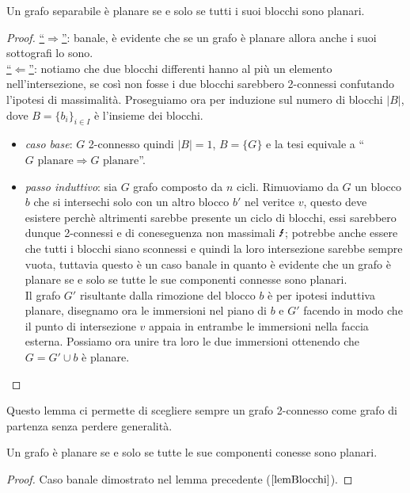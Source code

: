 \begin{lemma}\label{lemBlocchi}
    Un grafo separabile è planare se e solo se tutti i suoi blocchi sono planari.
    \begin{proof}
        \underline{“\(\Rightarrow\)”}: banale, è evidente che se un grafo è planare allora anche i suoi sottografi lo sono.\\
        \underline{“\(\Leftarrow\)”}: notiamo che due blocchi differenti hanno al più un elemento nell'intersezione, se così non fosse i due blocchi sarebbero 2-connessi confutando l'ipotesi di massimalità. Proseguiamo ora per induzione sul numero di blocchi \(|B|\), dove \(B={\{b_i\}}_{i \in I}\) è l'insieme dei blocchi.
        \begin{itemize}
            \item \textit{caso base}: \(G\) 2-connesso quindi \(|B|=1\), \(B=\{G\}\) e la tesi equivale a “\(G \text{ planare} \Rightarrow G \text{ planare}\)”.
            \item \textit{passo induttivo}: sia \(G\) grafo composto da \(n\) cicli. Rimuoviamo da \(G\) un blocco \(b\) che si intersechi solo con un altro blocco \(b'\) nel veritce \(v\), questo deve esistere perchè altrimenti sarebbe presente un ciclo di blocchi, essi sarebbero dunque 2-connessi e di coneseguenza non massimali \(\text{\Lightning}\); 
            potrebbe anche essere che tutti i blocchi siano sconnessi e quindi la loro intersezione sarebbe sempre vuota, tuttavia questo è un caso banale in quanto è evidente che un grafo è planare se e solo se tutte le sue componenti connesse sono planari. 
            \\ Il grafo \(G'\) risultante dalla rimozione del blocco \(b\) è per ipotesi induttiva planare, disegnamo ora le immersioni nel piano di \(b\) e \(G'\) facendo in modo che il punto di intersezione \(v\) appaia in entrambe le immersioni nella faccia esterna. Possiamo ora unire tra loro le due immersioni ottenendo che \(G=G' \cup b\) è planare.
        \end{itemize}
    \end{proof}
\end{lemma}
\noindent Questo lemma ci permette di scegliere sempre un grafo 2-connesso come grafo di partenza senza perdere generalità.

\begin{lemma}
    Un grafo è planare se e solo se tutte le sue componenti conesse sono planari.
    \begin{proof}
        Caso banale dimostrato nel lemma precedente (\(\ref{lemBlocchi}\)).
    \end{proof}
\end{lemma}

